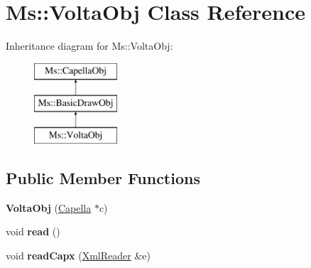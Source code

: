 \hypertarget{class_ms_1_1_volta_obj}{}\section{Ms\+:\+:Volta\+Obj Class Reference}
\label{class_ms_1_1_volta_obj}
Inheritance diagram for Ms\+:\+:Volta\+Obj\+:\begin{figure}[H]
\begin{center}
\leavevmode
\includegraphics[height=3.000000cm]{class_ms_1_1_volta_obj}
\end{center}
\end{figure}
\subsection*{Public Member Functions}
\begin{DoxyCompactItemize}
\item 
\mbox{\label{class_ms_1_1_volta_obj_aeb705744398d3dc0b650ceca39409889}} 
{\bfseries Volta\+Obj} (\hyperlink{class_ms_1_1_capella}{Capella} $\ast$c)
\item 
\mbox{\label{class_ms_1_1_volta_obj_a8e915fb690a692c092db7231e316e7aa}} 
void {\bfseries read} ()
\item 
\mbox{\label{class_ms_1_1_volta_obj_a40ab785284d3a89e360e175f624b3ef2}} 
void {\bfseries read\+Capx} (\hyperlink{class_ms_1_1_xml_reader}{Xml\+Reader} \&e)
\end{DoxyCompactItemize}
